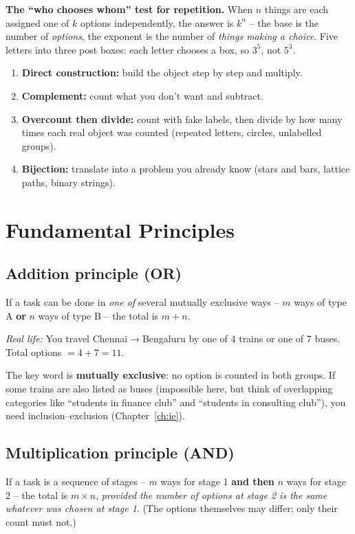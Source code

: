 \documentclass[11pt,a4paper,openany]{report}
\begin{document}
\textbf{The ``who chooses whom'' test for repetition.} When $n$ things are each assigned one of $k$
options independently, the answer is $k^n$ -- the base is the number of \emph{options}, the exponent is
the number of \emph{things making a choice}. Five letters into three post boxes: each letter chooses a
box, so $3^5$, not $5^3$.

\begin{idea}
\begin{enumerate}[nosep]
\item \textbf{Direct construction:} build the object step by step and multiply.
\item \textbf{Complement:} count what you don't want and subtract.
\item \textbf{Overcount then divide:} count with fake labels, then divide by how many times each real object was counted (repeated letters, circles, unlabelled groups).
\item \textbf{Bijection:} translate into a problem you already know (stars and bars, lattice paths, binary strings).
\end{enumerate}
\end{idea}

\chapter{Fundamental Principles}\label{ch:fund}

\section{Addition principle (OR)}
If a task can be done in \emph{one of} several mutually exclusive ways -- $m$ ways of type A
\textbf{or} $n$ ways of type B -- the total is $m+n$.

\textit{Real life:} You travel Chennai$\to$Bengaluru by one of 4 trains or one
of 7 buses. Total options $=4+7=11$.

The key word is \textbf{mutually exclusive}: no option is counted in both groups. If some
trains are also listed as buses (impossible here, but think of overlapping categories like
``students in finance club'' and ``students in consulting club''), you need inclusion--exclusion (Chapter~\ref{ch:ie}).

\section{Multiplication principle (AND)}
If a task is a sequence of stages -- $m$ ways for stage 1 \textbf{and then} $n$ ways for
stage 2 -- the total is $m\times n$, \emph{provided the number of options at stage 2 is the same
whatever was chosen at stage 1}. (The options themselves may differ; only their count must not.)
\end{document}
